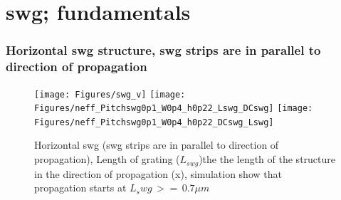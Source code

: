 \documentclass{beamer}
\begin{document}
\section{swg; fundamentals} 
\begin{frame}
\frametitle{Horizontal swg structure, swg strips are in parallel to direction of propagation }
\begin{figure}[H]
\texttt{[image: Figures/swg\_v]}
\texttt{[image: Figures/neff\_Pitchswg0p1\_W0p4\_h0p22\_Lswg\_DCswg]}
\texttt{[image: Figures/neff\_Pitchswg0p1\_W0p4\_h0p22\_DCswg\_Lswg]}
\caption{\small{Horizontal swg (swg strips are in parallel to direction of propagation), Length of grating ($L_{swg}$)the the length of the structure in the direction of propagation (x)}, simulation show that propagation starts at $L_swg \, >= \,0.7 \mu m$}
\label{vSwg}
\end{figure}

\end{frame}
%
\end{document}
